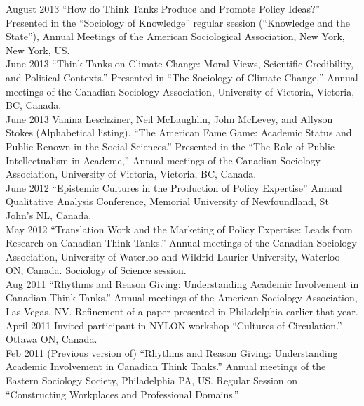 \documentclass[11pt,usenames,dvipsnames]{article}
\begin{document}
\ind August 2013 ``How do Think Tanks Produce and Promote Policy Ideas?'' Presented in the ``Sociology of Knowledge'' regular session (``Knowledge and the State''), Annual Meetings of the American Sociological Association, New York, New York, US. \\

\ind June 2013 ``Think Tanks on Climate Change: Moral Views, Scientific Credibility, and Political Contexts.'' Presented in ``The Sociology of Climate Change,'' Annual meetings of the Canadian Sociology Association, University of Victoria, Victoria, BC, Canada. \\

\ind June 2013 Vanina Leschziner, Neil McLaughlin, John McLevey, and Allyson Stokes (Alphabetical listing). ``The American Fame Game: Academic Status and Public Renown in the Social Sciences.'' Presented in the ``The Role of Public Intellectualism in Academe,'' Annual meetings of the Canadian Sociology Association, University of Victoria, Victoria, BC, Canada. \\

\ind June 2012 ``Epistemic Cultures in the Production of Policy Expertise'' Annual Qualitative Analysis Conference, Memorial University of Newfoundland, St John's NL, Canada.\\

\ind May 2012 ``Translation Work and the Marketing of Policy Expertise: Leads from Research on Canadian Think Tanks.'' Annual meetings of the Canadian Sociology Association, University of Waterloo and Wildrid Laurier University, Waterloo ON, Canada. Sociology of Science session.\\

\ind Aug 2011 ``Rhythms and Reason Giving: Understanding Academic Involvement in Canadian Think Tanks.'' Annual meetings of the American Sociology Association, Las Vegas, NV. Refinement of a paper presented in Philadelphia earlier that year. \\

\ind April 2011 Invited participant in NYLON workshop ``Cultures of Circulation.'' Ottawa ON, Canada.\\

\ind Feb 2011 (Previous version of) ``Rhythms and Reason Giving: Understanding Academic Involvement in Canadian Think Tanks.'' Annual meetings of the Eastern Sociology Society, Philadelphia PA, US. Regular Session on ``Constructing Workplaces and Professional Domains.''\\
\end{document}

